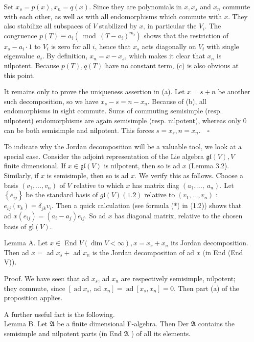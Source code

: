 \documentclass[10pt]{article}
\begin{document}
Set $x_{s}=p(x), x_{n}=q(x)$. Since they are polynomials in $x, x_{s}$ and $x_{n}$ commute with each other, as well as with all endomorphisms which commute with $x$. They also stabilize all subspaces of $V$ stabilized by $x$, in particular the $V_{i}$. The congruence $p(T) \equiv a_{i}\left(\bmod \left(T-a_{i}\right)^{m_{i}}\right)$ shows that the restriction of $x_{s}-a_{i} \cdot 1$ to $V_{i}$ is zero for all $i$, hence that $x_{s}$ acts diagonally on $V_{i}$ with single eigenvalue $a_{i}$. By definition, $x_{n}=x-x_{s}$, which makes it clear that $x_{n}$ is nilpotent. Because $p(T), q(T)$ have no constant term, (c) is also obvious at this point.

It remains only to prove the uniqueness assertion in (a). Let $x=s+n$ be another such decomposition, so we have $x_{s}-s=n-x_{n}$. Because of (b), all endomorphisms in sight commute. Sums of commuting semisimple (resp. nilpotent) endomorphisms are again semisimple (resp. nilpotent), whereas only 0 can be both semisimple and nilpotent. This forces $s=x_{s}, n=x_{n} . \quad \square$

To indicate why the Jordan decomposition will be a valuable tool, we look at a special case. Consider the adjoint representation of the Lie algebra $\mathfrak{g l}(V), V$ finite dimensional. If $x \in \mathfrak{g l}(V)$ is nilpotent, then so is ad $x$ (Lemma 3.2). Similarly, if $x$ is semisimple, then so is ad $x$. We verify this as follows. Choose a basis $\left(v_{1}, \ldots, v_{n}\right)$ of $V$ relative to which $x$ has matrix diag $\left(a_{1}, \ldots\right.$, $\left.a_{n}\right)$. Let $\left\{e_{i j}\right\}$ be the standard basis of $g \mathfrak{l}(V)(1.2)$ relative to $\left(v_{1}, \ldots, v_{n}\right)$ : $e_{i j}\left(v_{k}\right)=\delta_{j k} v_{i}$. Then a quick calculation (see formula (*) in (1.2)) shows that ad $x\left(e_{i j}\right)=\left(a_{i}-a_{j}\right) e_{i j}$. So ad $x$ has diagonal matrix, relative to the chosen basis of $\mathrm{gl}(V)$.

Lemma A. Let $x \in$ End $V(\operatorname{dim} V<\infty), x=x_{s}+x_{n}$ its Jordan decomposition. Then ad $x=$ ad $x_{s}+$ ad $x_{n}$ is the Jordan decomposition of ad $x$ (in End (End V)).

Proof. We have seen that ad $x_{s}$, ad $x_{n}$ are respectively semisimple, nilpotent; they commute, since $\left[\operatorname{ad} x_{s}\right.$, ad $\left.x_{n}\right]=\operatorname{ad}\left[x_{s}, x_{n}\right]=0$. Then part (a) of the proposition applies.

A further useful fact is the following.\\
Lemma B. Let $\mathfrak{A}$ be a finite dimensional F-algebra. Then Der $\mathfrak{A}$ contains the semisimple and nilpotent parts (in End $\mathfrak{A}$ ) of all its elements.
\end{document}
